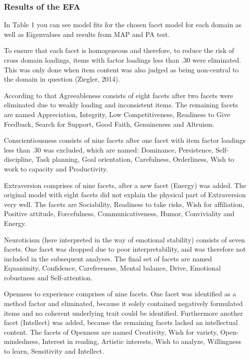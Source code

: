 \documentclass[,man]{apa6}
\theoremstyle{definition}
\theoremstyle{definition}
\theoremstyle{definition}
\theoremstyle{remark}
\begin{document}
\hypertarget{results-of-the-efa}{%
\subsubsection{Results of the EFA}\label{results-of-the-efa}}

In Table 1 you can see model fits for the chosen facet model for each
domain as well as Eigenvalues and results from MAP and PA test.

To ensure that each facet is homogeneous and therefore, to reduce the
risk of cross domain loadings, items with factor loadings less than .30
were eliminated. This was only done when item content was also judged as
being non-central to the domain in question (Ziegler, 2014).

According to that Agreeableness consists of eight facets after two
facets were eliminated due to weakly loading and inconsistent items. The
remaining facets are named Appreciation, Integrity, Low Competitiveness,
Readiness to Give Feedback, Search for Support, Good Faith, Genuineness
and Altruism.

Conscientiousness consists of nine facets after one facet with item
factor loadings less than .30 was excluded, which are named: Dominance,
Persistence, Self-discipline, Task planning, Goal orientation,
Carefulness, Orderliness, Wish to work to capacity and Productivity.

Extraversion comprises of nine facets, after a new facet (Energy) was
added. The original model with eight facets did not explain the physical
part of Extraversion very well. The facets are Sociability, Readiness to
take risks, Wish for affiliation, Positive attitude, Forcefulness,
Communicativeness, Humor, Conviviality and Energy.

Neuroticism (here interpreted in the way of emotional stability)
consists of seven facets. One facet was dropped due to poor
interpretability, and was therefore not included in the subsequent
analyses. The final set of facets are named Equanimity, Confidence,
Carefreeness, Mental balance, Drive, Emotional robustness and
Self-attention.

Openness to experience comprises of nine facets. One facet was
identified as a method factor and eliminated, because it solely
contained negatively formulated items and no coherent underlying trait
could be identified. Furthermore another facet (Intellect) was added,
because the remaining facets lacked an intellectual content. The facets
of Openness are named Creativity, Wish for variety, Open-mindedness,
Interest in reading, Artistic interests, Wish to analyze, Willingness to
learn, Sensitivity and Intellect.
\end{document}
